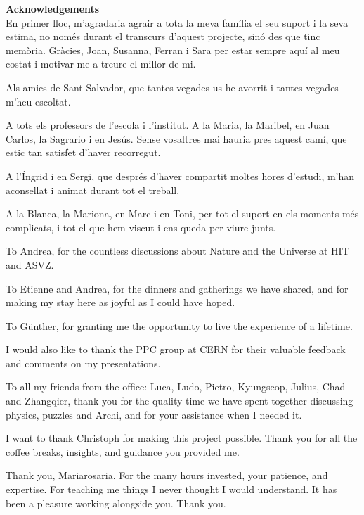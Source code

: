 \setlength{\parskip}{1em}
\thispagestyle{empty}
\noindent
{\huge \textbf{Acknowledgements}}
\\[1\baselineskip]
\noindent
En primer lloc, m'agradaria agrair a tota la meva família el seu suport i la seva estima, no només durant el transcurs d'aquest projecte, sinó des que tinc memòria. Gràcies, Joan, Susanna, Ferran i Sara per estar sempre aquí al meu costat i motivar-me a treure el millor de mi.

\noindent
Als amics de Sant Salvador, que tantes vegades us he avorrit i tantes vegades m'heu escoltat.

\noindent
A tots els professors de l'escola i l'institut. A la Maria, la Maribel, en Juan Carlos, la Sagrario i en Jesús. Sense vosaltres mai hauria pres aquest camí, que estic tan satisfet d'haver recorregut.

\noindent
A l'Íngrid i en Sergi, que després d'haver compartit moltes hores d'estudi, m'han aconsellat i animat durant tot el treball.

\noindent
A la Blanca, la Mariona, en Marc i en Toni, per tot el suport en els moments més complicats, i tot el que hem viscut i ens queda per viure junts.

\noindent
To Andrea, for the countless discussions about Nature and the Universe at HIT and ASVZ.

\noindent
To Etienne and Andrea, for the dinners and gatherings we have shared, and for making my stay here as joyful as I could have hoped.

\noindent
To Günther, for granting me the opportunity to live the experience of a lifetime.

\noindent
I would also like to thank the PPC group at CERN for their valuable feedback and comments on my presentations.

\noindent
To all my friends from the office: Luca, Ludo, Pietro, Kyungseop, Julius, Chad and Zhangqier, thank you for the quality time we have spent together discussing physics, puzzles and Archi, and for your assistance when I needed it.

\noindent
I want to thank Christoph for making this project possible. Thank you for all the coffee breaks, insights, and guidance you provided me.

\noindent
Thank you, Mariarosaria. For the many hours invested, your patience, and expertise. For teaching me things I never thought I would understand. It has been a pleasure working alongside you. Thank you.

\setlength{\parskip}{0.3em}